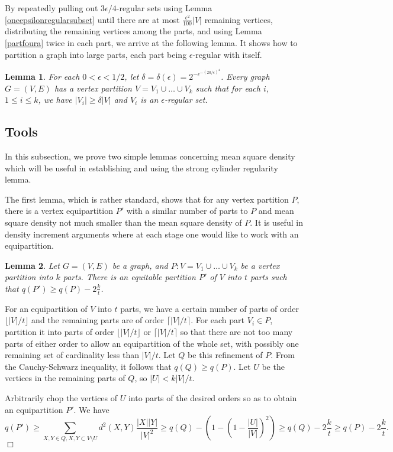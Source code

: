 \documentclass[11pt]{article}
\newtheorem{lemma}{Lemma}[section]
\newenvironment{proof}
      {\medskip\noindent{\bf Proof:}\hspace{1mm}}
      {\hfill$\Box$\medskip}
\begin{document}
By repeatedly pulling out $3\epsilon/4$-regular sets using Lemma
\ref{oneepsilonregularsubset} until there are at most
$\frac{\epsilon^2}{100}|V|$ remaining vertices, distributing the remaining
vertices among the parts, and using Lemma \ref{partfoura} twice in each part,  we
arrive at the following lemma. It shows how to partition a graph into large
parts, each part being $\epsilon$-regular with itself.

\begin{lemma}\label{epsdeltaone}
For each $0<\epsilon<1/2$, let
$\delta=\delta(\epsilon)=2^{-\epsilon^{-(20/\epsilon)^{4}}}$. Every graph
$G=(V,E)$ has a vertex partition $V=V_1 \cup \ldots \cup V_k$ such that for
each $i$, $1 \leq i \leq k$, we have $|V_i| \geq \delta|V|$ and $V_i$ is an
$\epsilon$-regular set.
\end{lemma}


\subsection{Tools}

In this subsection, we prove two simple lemmas concerning mean square density
which will be useful in establishing and using the strong cylinder regularity
lemma.


The first lemma, which is rather standard, shows that for any vertex partition
$P$, there is a vertex equipartition $P'$ with a similar number of parts to $P$
and mean square density not much smaller than the mean square density of $P$.
It is useful in density increment arguments where at each stage one would like
to work with an equipartition.

\begin{lemma}\label{makeequip} Let $G=(V,E)$ be a graph, and $P:V=V_1 \cup
\ldots \cup V_k$ be a vertex partition into $k$ parts.  There is an equitable
partition $P'$ of $V$ into $t$ parts such that $q(P') \geq q(P)-2\frac{k}{t}$.

\end{lemma}
\begin{proof}
For an equipartition of $V$ into $t$ parts, we have a certain number of parts
of order $\lfloor |V|/t \rfloor$ and the remaining parts are of order $\lceil
|V|/t \rceil$.
For each part $V_i \in P$, partition it into parts of order $\lfloor |V|/t
\rfloor$ or $\lceil |V|/t \rceil$ so that there are not too many parts of either
order to allow an equipartition of the whole set, with possibly one remaining set of cardinality less than $|V|/t$. Let $Q$ be this refinement of $P$. From the Cauchy-Schwarz inequality, it follows that $q(Q) \geq q(P)$. Let $U$ be the vertices in the remaining parts of
$Q$, so $|U| < k|V|/t$.

Arbitrarily chop the vertices of $U$ into parts of the desired orders so as to
obtain an equipartition $P'$.
We have $$q(P') \geq \sum_{X,Y \in Q, X,Y \subset V \setminus U}
d^2(X,Y)\frac{|X||Y|}{|V|^2}\geq
q(Q)-\left(1-\left(1-\frac{|U|}{|V|}\right)^2\right) \geq q(Q)-2\frac{k}{t}
\geq q(P)-2\frac{k}{t}.$$
\end{proof}
\end{document}
